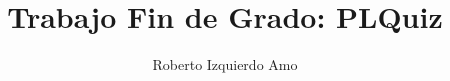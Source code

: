 \documentclass[a4paper,10pt,oneside]{memoir}
\title{Trabajo Fin de Grado: PLQuiz}
\author{Roberto Izquierdo Amo}
\date{}
\makeatletter
\def\maketitle{
  \null
  \thispagestyle{empty}
  \vfill
  \begin{center}\leavevmode
    \normalfont
    {\LARGE \@author\par}
    \hrulefill\par
    {\huge \@title\par}
    \vskip 1cm
  \end{center}
  \vfill
  \null
  \cleardoublepage
  }
\makeatother
\begin{document}
\maketitle

\frontmatter


\renewcommand*\abstractname{Resumen}
\begin{abstract}

\end{abstract}

\renewcommand*\abstractname{Descriptores}
\begin{abstract}

\end{abstract}

\clearpage


\renewcommand*\abstractname{Abstract}
\begin{abstract}

\end{abstract}

\renewcommand*\abstractname{Keywords}
\begin{abstract}

\end{abstract}

\mainmatter







\end{document}
